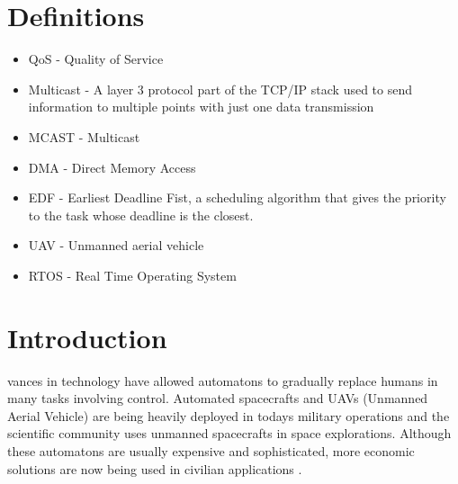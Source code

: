\documentclass[journal]{IEEEtran}
\begin{document}
\section{Definitions}
\begin{itemize}
\item QoS - Quality of Service
\item Multicast - A layer 3 protocol part of the TCP/IP stack used to send information to multiple points with just one data transmission
\item MCAST - Multicast
\item DMA - Direct Memory Access
\item EDF - Earliest Deadline Fist, a scheduling algorithm that gives the priority to the task whose deadline is the closest.
\item UAV - Unmanned aerial vehicle
\item RTOS - Real Time Operating System
\end{itemize}

\section{Introduction}
vances in technology have allowed automatons to gradually replace humans in many tasks involving control. Automated spacecrafts and UAVs (Unmanned Aerial Vehicle) are being heavily deployed in todays military operations and the scientific
community uses unmanned spacecrafts in space explorations. Although these automatons are usually expensive and sophisticated, more economic solutions are now being used in civilian applications \cite{YS1}.
\end{document}
